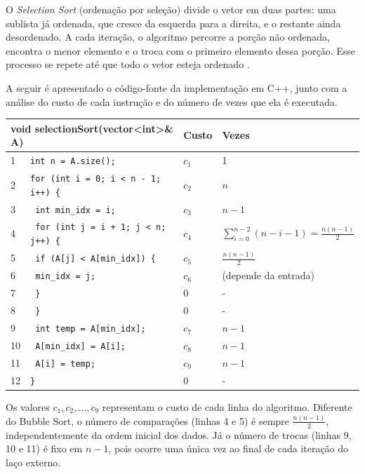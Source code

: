 
\qquad O \textit{Selection Sort} (ordenação por seleção) divide o vetor em duas partes: uma sublista já ordenada, que cresce da esquerda para a direita, e o restante ainda desordenado. A cada iteração, o algoritmo percorre a porção não ordenada, encontra o menor elemento e o troca com o primeiro elemento dessa porção. Esse processo se repete até que todo o vetor esteja ordenado \cite{sedgewick}.


\qquad A seguir é apresentado o código-fonte da implementação em C++, junto com a análise do custo de cada instrução e do número de vezes que ela é executada.

\vspace{1cm} %

\begin{center}
\begin{tabular}{l l l l}
\hline
\multicolumn{2}{l}{\textbf{void selectionSort(vector<int>\& A)}} & \textbf{Custo} & \textbf{Vezes} \\
\hline
1 & \texttt{int n = A.size();} & $c_1$ & 1 \\
2 & \texttt{for (int i = 0; i < n - 1; i++) \{} & $c_2$ & $n$ \\
3 & \texttt{    int min\_idx = i;} & $c_3$ & $n-1$ \\
4 & \texttt{    for (int j = i + 1; j < n; j++) \{} & $c_4$ & $\sum_{i=0}^{n-2} (n-i-1) = \frac{n(n-1)}{2}$ \\
5 & \texttt{        if (A[j] < A[min\_idx]) \{} & $c_5$ & $\frac{n(n-1)}{2}$ \\
6 & \texttt{            min\_idx = j;} & $c_6$ & (depende da entrada) \\
7 & \texttt{        \}} & 0 & - \\
8 & \texttt{    \}} & 0 & - \\
9 & \texttt{    int temp = A[min\_idx];} & $c_7$ & $n-1$ \\
10 & \texttt{    A[min\_idx] = A[i];} & $c_8$ & $n-1$ \\
11 & \texttt{    A[i] = temp;} & $c_9$ & $n-1$ \\
12 & \texttt{\}} & 0 & - \\
\hline
\end{tabular}
\end{center}

\vspace{1cm} %

\qquad Os valores $c_1, c_2, \dots, c_9$ representam o custo de cada linha do algoritmo. Diferente do Bubble Sort, o número de comparações (linhas 4 e 5) é sempre $\frac{n(n-1)}{2}$, independentemente da ordem inicial dos dados. Já o número de trocas (linhas 9, 10 e 11) é fixo em $n-1$, pois ocorre uma única vez ao final de cada iteração do laço externo.